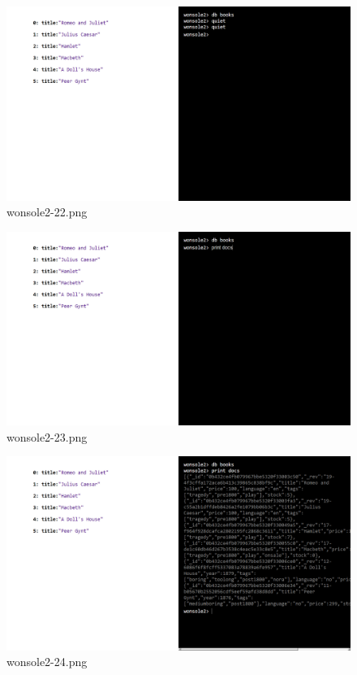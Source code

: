 \begin{figure}
\includegraphics[width=\textwidth]{screenshot/wonsole2/wonsole2-22.png}
\caption{wonsole2-22.png}
\label{wonsole2-22.png}
\end{figure}


\clearpage
\begin{figure}
\includegraphics[width=\textwidth]{screenshot/wonsole2/wonsole2-23.png}
\caption{wonsole2-23.png}
\label{wonsole2-23.png}
\end{figure}


\begin{figure}
\includegraphics[width=\textwidth]{screenshot/wonsole2/wonsole2-24.png}
\caption{wonsole2-24.png}
\label{wonsole2-24.png}
\end{figure}


